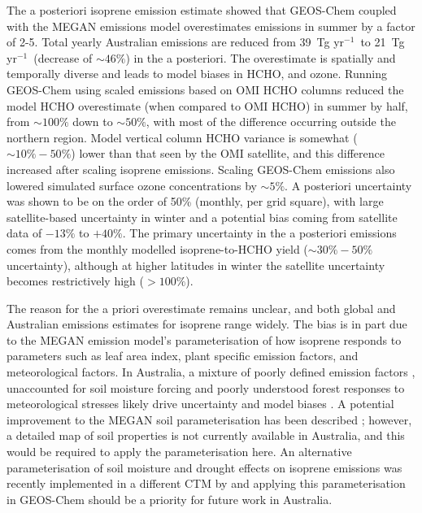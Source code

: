 \documentclass[acp, manuscript]{copernicus}
\newcommand{\parencite}{\citep}
\newcommand{\textcite}{\citet}
\newcommand{\tgpyr}{~Tg yr$^{-1}$}
\begin{document}
  The a posteriori isoprene emission estimate showed that GEOS-Chem coupled with the MEGAN emissions model overestimates emissions in summer by a factor of 2-5.
  Total yearly Australian emissions are reduced from 39\tgpyr ~to 21\tgpyr ~(decrease of $\sim{46}\%$) in the a posteriori.
  The overestimate is spatially and temporally diverse and leads to model biases in HCHO, and ozone.
  Running GEOS-Chem using scaled emissions based on OMI HCHO columns reduced the model HCHO overestimate (when compared to OMI HCHO) in summer by half, from $\sim{100\%}$ down to $\sim{50\%}$, with most of the difference occurring outside the northern region.
  Model vertical column HCHO variance is somewhat ($\sim{10\%-50\%}$) lower than that seen by the OMI satellite, and this difference increased after scaling isoprene emissions.
  Scaling GEOS-Chem emissions also lowered simulated surface ozone concentrations by $\sim 5\%$.
  A posteriori uncertainty was shown to be on the order of 50\%  (monthly, per grid square), with large satellite-based uncertainty in winter and a potential bias coming from satellite data of $-13\%$ to $+40\%$.
  The primary uncertainty in the a posteriori emissions comes from the monthly modelled isoprene-to-HCHO yield ($\sim 30\%-50\%$ uncertainty), although at higher latitudes in winter the satellite uncertainty becomes restrictively high ($>100\%$).
  
  
  The reason for the a priori overestimate remains unclear, and both global and Australian emissions estimates for isoprene range widely.
  The bias is in part due to the MEGAN emission model's parameterisation of how isoprene responds to parameters such as leaf area index, plant specific emission factors, and meteorological factors. 
  In Australia, a mixture of poorly defined emission factors \parencite[e.g.,][]{Emmerson2016}, unaccounted for soil moisture forcing \parencite[e.g.,][]{Sindelarova2014, Emmerson2019} and poorly understood forest responses to meteorological stresses likely drive uncertainty and model biases \parencite{Jiang2018,Emmerson2019}.
  A potential improvement to the MEGAN soil parameterisation has been described \parencite{Jiang2018}; however, a detailed map of soil properties is not currently available in Australia, and this would be required to apply the parameterisation here.
  An alternative parameterisation of soil moisture and drought effects on isoprene emissions was recently implemented in a different CTM by \textcite{Emmerson2019} and applying this parameterisation in GEOS-Chem should be a priority for future work in Australia.  
\end{document}
